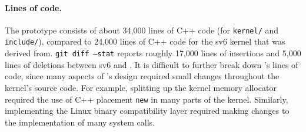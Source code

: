 \paragraph{Lines of code.}

The \sys prototype consists of about 34,000 lines of C++ code (for
\texttt{kernel/} and \texttt{include/}), compared to 24,000 lines of
C++ code for the sv6 kernel that \sys was derived from.
\texttt{git diff --stat} reports roughly 17,000 lines of insertions and 5,000
lines of deletions between sv6 and \sys.
It is difficult to further
break down \sys's lines of code, since many aspects of \sys's design
required small changes throughout the kernel's source code.  For
example, splitting up the kernel memory allocator required the use of
C++ placement \texttt{new} in many parts of the kernel.  Similarly,
implementing the Linux binary compatibility layer required making
changes to the implementation of many system calls.

